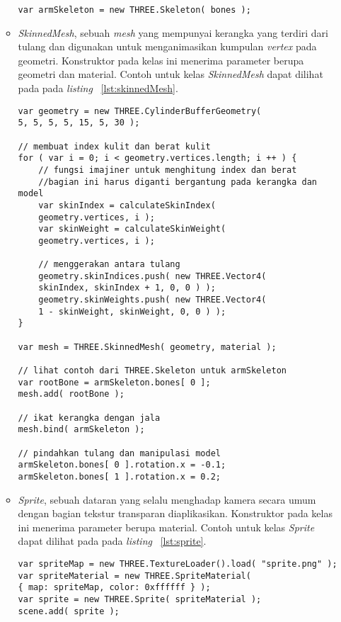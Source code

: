 \begin{itemize}
\begin{itemize}
\begin{lstlisting}[caption={Contoh penggunaan kelas {\it Skeleton}.}, label={lst:skeleton},captionpos=b]
var armSkeleton = new THREE.Skeleton( bones );
\end{lstlisting}
		\item {\it SkinnedMesh}, sebuah {\it mesh} yang mempunyai kerangka yang terdiri dari tulang dan digunakan untuk menganimasikan kumpulan {\it vertex} pada geometri. Konstruktor pada kelas ini menerima parameter berupa geometri dan material. Contoh untuk kelas {\it SkinnedMesh} dapat dilihat pada pada {\it listing} ~\ref{lst:skinnedMesh}.
\begin{lstlisting}[caption={Contoh penggunaan kelas {\it SkinnedMesh}.}, label={lst:skinnedMesh},captionpos=b]
var geometry = new THREE.CylinderBufferGeometry( 
5, 5, 5, 5, 15, 5, 30 );

// membuat index kulit dan berat kulit
for ( var i = 0; i < geometry.vertices.length; i ++ ) {
	// fungsi imajiner untuk menghitung index dan berat
	//bagian ini harus diganti bergantung pada kerangka dan model
	var skinIndex = calculateSkinIndex( 
	geometry.vertices, i );
	var skinWeight = calculateSkinWeight( 
	geometry.vertices, i );

	// menggerakan antara tulang
	geometry.skinIndices.push( new THREE.Vector4( 
	skinIndex, skinIndex + 1, 0, 0 ) );
	geometry.skinWeights.push( new THREE.Vector4(
	1 - skinWeight, skinWeight, 0, 0 ) );
}

var mesh = THREE.SkinnedMesh( geometry, material );

// lihat contoh dari THREE.Skeleton untuk armSkeleton
var rootBone = armSkeleton.bones[ 0 ];
mesh.add( rootBone );

// ikat kerangka dengan jala
mesh.bind( armSkeleton );

// pindahkan tulang dan manipulasi model
armSkeleton.bones[ 0 ].rotation.x = -0.1;
armSkeleton.bones[ 1 ].rotation.x = 0.2;
\end{lstlisting}
		\item {\it Sprite}, sebuah dataran yang selalu menghadap kamera secara umum dengan bagian tekstur transparan diaplikasikan. Konstruktor pada kelas ini menerima parameter berupa material. Contoh untuk kelas {\it Sprite} dapat dilihat pada pada {\it listing} ~\ref{lst:sprite}.
\begin{lstlisting}[caption={Contoh penggunaan kelas {\it Sprite}.}, label={lst:sprite},captionpos=b]
var spriteMap = new THREE.TextureLoader().load( "sprite.png" );
var spriteMaterial = new THREE.SpriteMaterial( 
{ map: spriteMap, color: 0xffffff } );
var sprite = new THREE.Sprite( spriteMaterial );
scene.add( sprite );
\end{lstlisting}
	\end{itemize}
	

\end{itemize}
